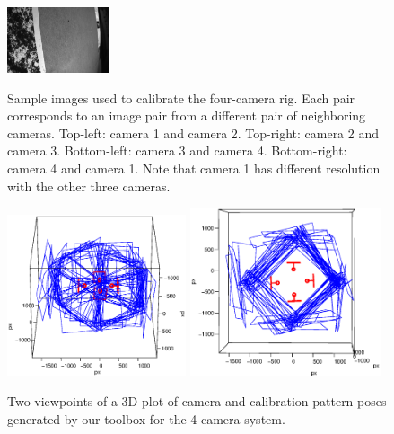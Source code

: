 \documentclass{report}
\begin{document}
\begin{figure}
\includegraphics[width=0.27\textwidth]{images/cam4rig/8} \\%
\caption{Sample images used to calibrate the four-camera rig. Each pair corresponds to an image pair from a different pair of neighboring cameras. Top-left: camera 1 and camera 2. Top-right: camera 2 and camera 3. Bottom-left: camera 3 and camera 4. Bottom-right: camera 4 and camera 1. Note that camera 1 has different resolution with the other three cameras. }
\label{cameraRigImageFig}
\end{figure}

\begin{figure}
\centering 
\includegraphics[trim=1in 0in 0.1in 0.4in, clip=true, width=0.47\textwidth]{images/rig2} 
\includegraphics[trim=0.2in 0in 0.6in 0.4in, clip=true, width=0.5\textwidth]{images/rig1} 
\caption{Two viewpoints of a 3D plot of camera and calibration pattern poses generated by our toolbox for the 4-camera system. } 
\label{cameraRigPlot}
\end{figure}
\end{document}

